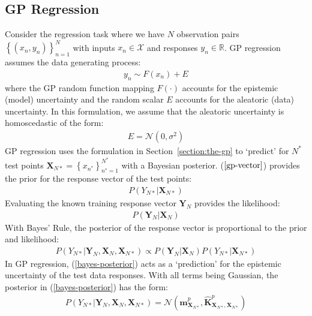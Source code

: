 \documentclass{article}
\numberwithin{equation}{section}
\begin{document}
\subsection{GP Regression}
Consider the regression task where we have $N$ observation pairs $\left\{(x_n, y_n)\right\}_{n=1}^{N}$ with inputs $x_n \in \mathcal{X}$ and responses $y_n \in \mathbb{R}$. GP regression assumes the data generating process:
\begin{align}
    y_n \sim F(x_n) + E
    \label{regression-data-uncertainties}
\end{align}
where the GP random function mapping $F(\cdot)$ accounts for the epistemic (model) uncertainty and the random scalar $E$ accounts for the aleatoric (data) uncertainty. In this formulation, we assume that the aleatoric uncertainty is homoscedastic of the form:
\begin{align}
    E = \mathcal{N} \left(0, \sigma^2\right)
    \label{aleotric-uncertainty}
\end{align}
GP regression uses the formulation in Section~\ref{section:the-gp} to `predict' for $N^*$ test points $\mathbf{X}_{N*} = \left\{ x_{n^*}\right\}_{n^*=1}^{N^*}$ with a Bayesian posterior. ($\ref{gp-vector}$) provides the prior for the response vector of the test points:
\begin{align}
    \label{gp-prior}
    P\left(Y_{N*}\vert \mathbf{X}_{N*}\right)
\end{align}
Evaluating the known training response vector $\mathbf{Y}_{N}$ provides the likelihood:
\begin{align}
     \label{gp-likelihood}
    P\left(\mathbf{Y}_{N} \vert \mathbf{X}_{N} \right)
\end{align}
With Bayes' Rule, the posterior of the response vector is proportional to the prior and likelihood:
\begin{align}
     P\left(Y_{N*} | \mathbf{Y}_{N},  \mathbf{X}_{N},  \mathbf{X}_{N*}\right) \propto P\left(\mathbf{Y}_{N} \vert \mathbf{X}_{N} \right) P\left(Y_{N*}\vert \mathbf{X}_{N*}\right)
    \label{bayes-posterior}
\end{align}
In GP regression, (\ref{bayes-posterior}) acts as a `prediction' for the epistemic uncertainty of the test data responses. With all terms being Gaussian, the posterior in (\ref{bayes-posterior}) has the form:
\begin{align}
    P\left(Y_{N*} | \mathbf{Y}_{N},  \mathbf{X}_{N},  \mathbf{X}_{N*}\right)  =  \mathcal{N}\left(\hat{\mathbf{m}}^p_{\mathbf{X}_{N*}}, \hat{\mathbf{K}}^p_{\mathbf{X}_{N*}, \mathbf{X}_{N*}}\right)
    \label{gp-epistemic-posterior}
\end{align}
\end{document}
